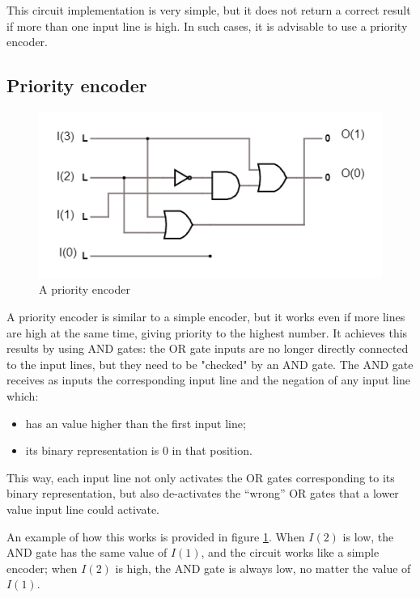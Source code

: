 \documentclass{article}
\begin{document}
This circuit implementation is very simple, but it does not return a correct result if more than one input line is high. In such cases, it is advisable to use a priority encoder.

\clearpage

\subsection{Priority encoder} \label{PriorityEncoderSection}

\begin{figure}[h]
  \centering
  \includegraphics[scale=0.7]{priority_encoder}
  \caption{A priority encoder}
  \label{priority_encoder}
\end{figure}

A priority encoder is similar to a simple encoder, but it works even if more lines are high at the same time, giving priority to the highest number. It achieves this results by using AND gates: the OR gate inputs are no longer directly connected to the input lines, but they need to be "checked" by an AND gate. The AND gate receives as inputs the corresponding input line and the negation of any input line which:

\begin{itemize}
\item has an value higher than the first input line;
\item its binary representation is 0 in that position.
\end{itemize}

This way, each input line not only activates the OR gates corresponding to its binary representation, but also de-activates the ``wrong'' OR gates that a lower value input line could activate.

\vspace{3mm}

An example of how this works is provided in figure \ref{priority_encoder}. When $I(2)$ is low, the AND gate has the same value of $I(1)$, and the circuit works like a simple encoder; when $I(2)$ is high, the AND gate is always low, no matter the value of $I(1)$.
\end{document}
